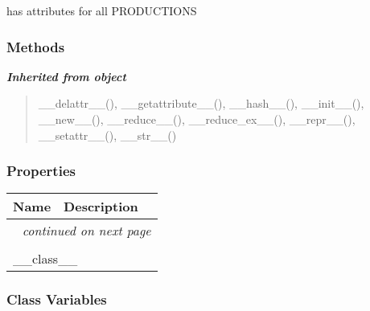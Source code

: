 has attributes for all PRODUCTIONS


  \subsubsection{Methods}


\large{\textbf{\textit{Inherited from object}}}

\begin{quote}
\_\_delattr\_\_(), \_\_getattribute\_\_(), \_\_hash\_\_(), \_\_init\_\_(), \_\_new\_\_(), \_\_reduce\_\_(), \_\_reduce\_ex\_\_(), \_\_repr\_\_(), \_\_setattr\_\_(), \_\_str\_\_()
\end{quote}


  \subsubsection{Properties}

    \vspace{-1cm}
\hspace{\varindent}\begin{longtable}{|p{\varnamewidth}|p{\vardescrwidth}|l}
\cline{1-2}
\cline{1-2} \centering \textbf{Name} & \centering \textbf{Description}& \\
\cline{1-2}
\endhead\cline{1-2}\multicolumn{3}{r}{\small\textit{continued on next page}}\\\endfoot\cline{1-2}
\endlastfoot\multicolumn{2}{|l|}{\textit{Inherited from object}}\\
\multicolumn{2}{|p{\varwidth}|}{\raggedright \_\_class\_\_}\\
\cline{1-2}
\end{longtable}



  \subsubsection{Class Variables}

